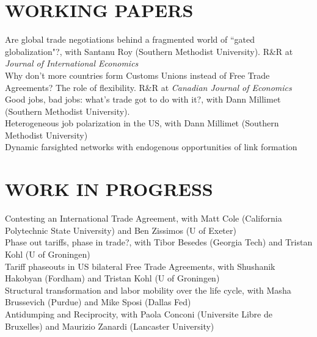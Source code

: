 \documentclass[11pt]{res}
\begin{document}
\begin{resume}
\section{WORKING PAPERS}\vspace{1.5mm}
{Are global trade negotiations behind a fragmented world of ``gated globalization"?}, with Santanu Roy (Southern Methodist University). R\&R at \emph{Journal of International Economics}\vspace{1.5mm}\\
{Why don't more countries form Customs Unions instead of Free Trade Agreements? The role of flexibility}. R\&R at \emph{Canadian Journal of Economics} \vspace{1.5mm}\\
{Good jobs, bad jobs: what's trade got to do with it?}, with Dann Millimet (Southern Methodist University).\vspace{1.5mm}\\
{Heterogeneous job polarization in the US}, with Dann Millimet (Southern Methodist University)\vspace{1.5mm}\\
{Dynamic farsighted networks with endogenous opportunities of link formation} \vspace{1.5mm}\\

\section{WORK IN PROGRESS}\vspace{1.5mm}
Contesting an International Trade Agreement, with Matt Cole (California Polytechnic State University) and Ben Zissimos (U of Exeter) \vspace{1.5mm}\\
Phase out tariffs, phase in trade?, with Tibor Besedes (Georgia Tech) and Tristan Kohl (U of Groningen) \vspace{1.5mm}\\
Tariff phaseouts in US bilateral Free Trade Agreements, with Shushanik Hakobyan (Fordham) and Tristan Kohl (U of Groningen)\vspace{1.5mm}\\
Structural transformation and labor mobility over the life cycle, with Masha Brussevich (Purdue) and Mike Sposi (Dallas Fed)\vspace{1.5mm}\\
Antidumping and Reciprocity, with Paola Conconi (Universite Libre de Bruxelles) and Maurizio Zanardi (Lancaster University)\\


\end{resume}
\end{document}
